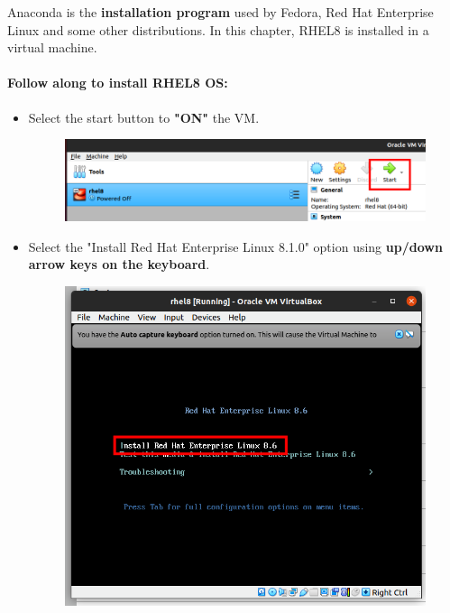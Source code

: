 \setlength{\columnsep}{3pt}
\begin{flushleft}

\bigskip
Anaconda is the \textbf{installation program} used by Fedora, Red Hat Enterprise Linux and some other distributions. In this chapter, RHEL8 is installed in a virtual machine. 

 
\paragraph{Follow along to install RHEL8 OS:}
 
 \begin{itemize}
	\item Select the start button to \textbf{"ON"} the VM.
	 	\begin{figure}[h!]
		\centering
		\includegraphics[scale=.3]{content/chapter18/images/image1.2.png}
	\end{figure}		
	
	
 	\item Select the "Install Red Hat Enterprise Linux 8.1.0" option using \textbf{up/down arrow keys on the keyboard}.
 	\begin{figure}[h!]
 		\centering
 		\includegraphics[scale=.2]{content/chapter18/images/image11.png}
 	\end{figure}		



\end{itemize}
\end{flushleft}
